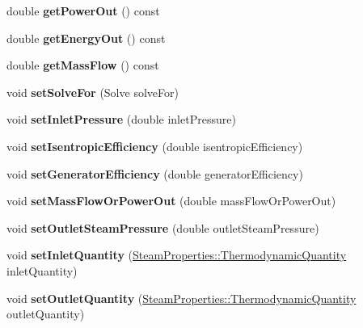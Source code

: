 \begin{DoxyCompactItemize}
\mbox{\label{class_turbine_a89585cc2fbfdbe67d539eae08c369fa2}} 
double {\bfseries get\+Power\+Out} () const
\item 
\mbox{\label{class_turbine_a143fc660274e0d65ccb8fc55cc2caf83}} 
double {\bfseries get\+Energy\+Out} () const
\item 
\mbox{\label{class_turbine_a4893a203dbbf9db9ca77a0b278c4c118}} 
double {\bfseries get\+Mass\+Flow} () const
\item 
\mbox{\label{class_turbine_a96f54a8fc572dae6c5298289de890f4d}} 
void {\bfseries set\+Solve\+For} (Solve solve\+For)
\item 
\mbox{\label{class_turbine_a04996baab9a40d449a69c737c00be8e4}} 
void {\bfseries set\+Inlet\+Pressure} (double inlet\+Pressure)
\item 
\mbox{\label{class_turbine_ae67daa481ef48bcf8aef84bcccb4611d}} 
void {\bfseries set\+Isentropic\+Efficiency} (double isentropic\+Efficiency)
\item 
\mbox{\label{class_turbine_a51e9c5050a5be51b86dc23e690bd3f40}} 
void {\bfseries set\+Generator\+Efficiency} (double generator\+Efficiency)
\item 
\mbox{\label{class_turbine_a73522631e2eeefa8ea14d5b537e3e760}} 
void {\bfseries set\+Mass\+Flow\+Or\+Power\+Out} (double mass\+Flow\+Or\+Power\+Out)
\item 
\mbox{\label{class_turbine_ab9612657de02e4523492b687917b4091}} 
void {\bfseries set\+Outlet\+Steam\+Pressure} (double outlet\+Steam\+Pressure)
\item 
\mbox{\label{class_turbine_aecc05c70870fb11bbc0bb4fe5d8438bd}} 
void {\bfseries set\+Inlet\+Quantity} (\hyperlink{class_steam_properties_ae0294bedf7d178c2d8fb6aed0f62fbff}{Steam\+Properties\+::\+Thermodynamic\+Quantity} inlet\+Quantity)
\item 
\mbox{\label{class_turbine_ad5ff4ba1657aac9519a6841336ec571c}} 
void {\bfseries set\+Outlet\+Quantity} (\hyperlink{class_steam_properties_ae0294bedf7d178c2d8fb6aed0f62fbff}{Steam\+Properties\+::\+Thermodynamic\+Quantity} outlet\+Quantity)

\end{DoxyCompactItemize}
